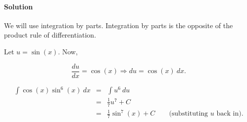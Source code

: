 

\paragraph{Solution}

We will use integration by parts. Integration by parts is the opposite of the product rule of differentiation.

Let $u=\sin\left(x\right)$. Now,

\[\frac{du}{dx}=\cos\left(x\right)\Rightarrow du=\cos\left(x\right)~dx.\]

\begin{eqnarray*}
	\int\cos\left(x\right)\sin^6\left(x\right)~dx&=&\int u^6~du\\
	&=&\frac{1}{7}u^7+C\\
	&=&\frac{1}{7}\sin^7\left(x\right)+C\qquad\mbox{(substituting }u\mbox{ back in)}.
\end{eqnarray*}
